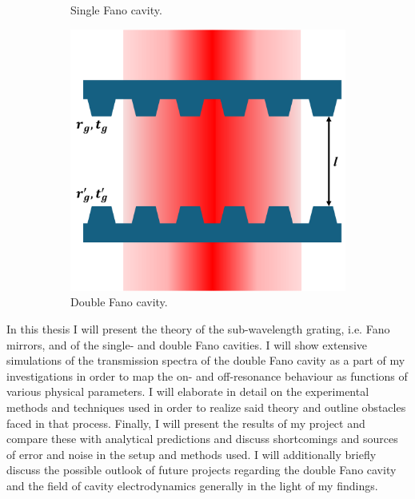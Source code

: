 \begin{figure}[h!]
\begin{subfigure}[b]{0.3\textwidth}
        \caption{Single Fano cavity.}
        \label{fig:single_fano_cavity_sketch}
    \end{subfigure}
    \hfill
    \begin{subfigure}[b]{0.3\textwidth}
        \includegraphics[width=\textwidth]{figures/double_fano_sketch.pdf}
        \caption{Double Fano cavity.}
        \label{fig:double_fano_cavity_sketch}
    \end{subfigure}
    \caption{}
    \label{fig:all_cavities_sketch}
\end{figure}

In this thesis I will present the theory of the sub-wavelength grating, i.e. Fano mirrors, and of the single- and double Fano cavities. I will show extensive simulations of the transmission spectra of the double Fano cavity as a part of my investigations in order to map the on- and off-resonance behaviour as functions of various physical parameters. I will elaborate in detail on the experimental methods and techniques used in order to realize said theory and outline obstacles faced in that process. Finally, I will present the results of my project and compare these with analytical predictions and discuss shortcomings and sources of error and noise in the setup and methods used. I will additionally briefly discuss the possible outlook of future projects regarding the double Fano cavity and the field of cavity electrodynamics generally in the light of my findings. 